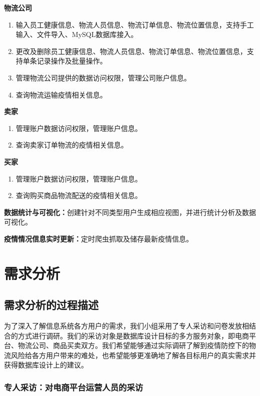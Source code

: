 \documentclass[12pt]{article}
\begin{document}
\noindent \textbf{物流公司}
\begin{enumerate}
	\item 输入员工健康信息、物流人员信息、物流订单信息、物流位置信息，支持手工输入、文件导入、MySQL数据库接入。
	\item 更改及删除员工健康信息、物流人员信息、物流订单信息、物流位置信息，支持单条记录操作及批量操作。
	\item 管理物流公司提供的数据访问权限，管理公司账户信息。
	\item 查询物流运输疫情相关信息。
\end{enumerate}

\noindent \textbf{卖家}
\begin{enumerate}
	\item 管理账户数据访问权限，管理账户信息。
	\item 查询卖家订单物流的疫情相关信息。
\end{enumerate}

\noindent \textbf{买家}
\begin{enumerate}
	\item 管理账户数据访问权限，管理账户信息。
	\item 查询购买商品物流配送的疫情相关信息。
\end{enumerate}
\noindent \textbf{数据统计与可视化：}创建针对不同类型用户生成相应视图，并进行统计分析及数据可视化。

\vspace{0.2cm}
\noindent \textbf{疫情情况信息实时更新：}定时爬虫抓取及储存最新疫情信息。

\section{需求分析}

\subsection{需求分析的过程描述}

为了深入了解信息系统各方用户的需求，我们小组采用了专人采访和问卷发放相结合的方式进行调研。我们的采访对象是数据库设计目标的多方服务对象，即电商平台、物流公司、商品买卖双方。我们希望能够通过实际调研了解到疫情防控下的物流风险给各方用户带来的难处，也希望能够更准确地了解各目标用户的真实需求并获得数据库设计上的建议。

\subsubsection{专人采访：对电商平台运营人员的采访}
\end{document}
